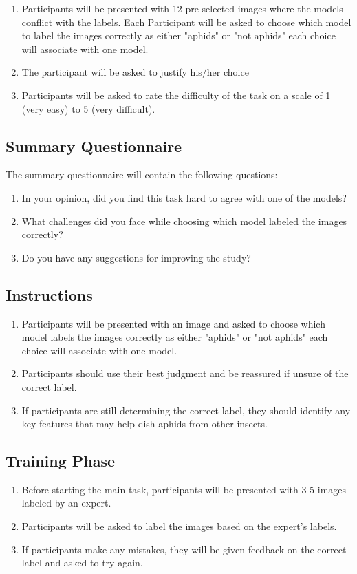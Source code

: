\documentclass{article}
\begin{document}
\begin{enumerate}
    \item Participants will be presented with 12 pre-selected images where the models conflict with the labels. Each Participant will be asked to 
    choose which model to label the images correctly as either "aphids" or "not aphids" each choice will associate with one model.
    \item The participant will be asked to justify his/her choice
    \item Participants will be asked to rate the difficulty of the task on a scale of 1 (very easy) to 5 (very difficult).
\end{enumerate}

\subsection{Summary Questionnaire}
The summary questionnaire will contain the following questions: 

\begin{enumerate}
    \item In your opinion, did you find this task hard to agree with one of the models?
    \item What challenges did you face while choosing which model labeled the images correctly?
    \item Do you have any suggestions for improving the study?
\end{enumerate}

\subsection{Instructions}
\begin{enumerate}
    \item Participants will be presented with an image and asked to choose which model
    labels the images correctly as either "aphids" or "not aphids" each choice will associate with one model.
    \item Participants should use their best judgment and be reassured if unsure of the correct label.
    \item If participants are still determining the correct label, they should identify any key features that may help dish aphids from other insects.
\end{enumerate}

\subsection{Training Phase}
\begin{enumerate}
    \item Before starting the main task, participants will be presented with 3-5 images labeled by an expert.
    \item Participants will be asked to label the images based on the expert's labels.
    \item If participants make any mistakes, they will be given feedback on the correct label and asked to try again.
\end{enumerate}
\end{document}
